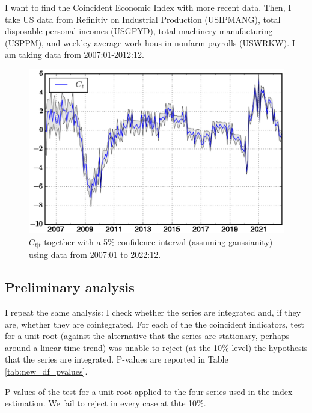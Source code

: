 
I want to find the Coincident Economic Index with more recent data. Then, I take US data from Refinitiv on Industrial Production (USIPMANG), total disposable personal incomes (USGPYD), total machinery manufacturing (USPPM), and weekley average work hous in nonfarm payrolls (USWRKW).  I am taking data from 2007:01-2012:12.


\begin{figure}[h!]
	\centering
	\captionsetup{width=0.5\textwidth, font=small}
	\caption{$C_{t|t}$ together with a 5\% confidence interval (assuming gaussianity) using data from 2007:01 to 2022:12.}\label{fig:new_cei}
	\includegraphics[scale=0.5]{fig/newdata_CEI}
\end{figure}

\subsection{Preliminary analysis}

I repeat the same analysis: I check whether the series are integrated and, if they are, whether they are cointegrated.  For each of the the coincident indicators,  test for a unit root (against the alternative that the series are stationary, perhaps around a linear time trend) was unable to reject (at the 10\% level) the hypothesis that the series are integrated. P-values are reported in Table \ref{tab:new_df_pvalues}.

\begin{table}[h!]
	\centering\small
	\captionsetup{width=0.6\textwidth, font=small}
	\caption{P-values of the test \protect{} for a unit root applied to the four series used in the index estimation. We fail to reject in every case at thte 10\%.}\label{tab:new_df_pvalues}
	\vspace{0cm}
	
\end{table}

